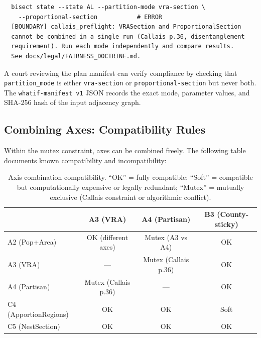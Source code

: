 \begin{verbatim}
  bisect state --state AL --partition-mode vra-section \
    --proportional-section           # ERROR
  [BOUNDARY] callais_preflight: VRASection and ProportionalSection
  cannot be combined in a single run (Callais p.36, disentanglement
  requirement). Run each mode independently and compare results.
  See docs/legal/FAIRNESS_DOCTRINE.md.
\end{verbatim}

A court reviewing the plan manifest can verify compliance by checking that
\texttt{partition\_mode} is either \texttt{vra-section} or
\texttt{proportional-section} but never both.
The \texttt{whatif-manifest v1} JSON records the exact mode, parameter values,
and SHA-256 hash of the input adjacency graph.

\subsection{Combining Axes: Compatibility Rules}

Within the mutex constraint, axes can be combined freely.
The following table documents known compatibility and incompatibility:

\begin{table}[h]
\centering
\small
\caption{Axis combination compatibility. ``OK'' = fully compatible; ``Soft'' =
  compatible but computationally expensive or legally redundant;
  ``Mutex'' = mutually exclusive (Callais constraint or algorithmic conflict).}
\label{tab:compatibility}
\begin{tabular}{l ccc}
\toprule
 & A3 (VRA) & A4 (Partisan) & B3 (County-sticky) \\
\midrule
A2 (Pop+Area) & OK (different axes) & Mutex (A3 vs A4) & OK \\
A3 (VRA) & --- & Mutex (Callais p.36) & OK \\
A4 (Partisan) & Mutex (Callais p.36) & --- & OK \\
C4 (ApportionRegions) & OK & OK & Soft \\
C5 (NestSection) & OK & OK & OK \\
\bottomrule
\end{tabular}
\end{table}
